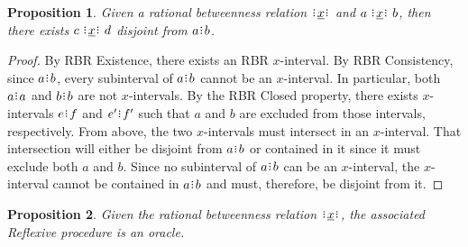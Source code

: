 \documentclass[12pt]{article}
\newtheorem{proposition}{Proposition}[section]
\begin{document}
\begin{proposition}
    Given  a rational betweenness relation $\xrel$ and \sout{$a\xrel b$}, then there exists $c \xrel d$ disjoint from $a\rint b$.
\end{proposition}

\begin{proof}
    By RBR Existence, there exists an RBR $x$-interval. By RBR Consistency,  since \sout{$a\rint b$}, every subinterval of $a \rint b$ cannot be an $x$-interval. In particular, both $a\rint a$ and $b\rint b$ are not $x$-intervals. By the RBR Closed property, there exists $x$-intervals $e\rint f$ and $e'\rint f'$ such that $a$ and $b$ are excluded from those intervals, respectively. From above, the two $x$-intervals must intersect in an $x$-interval. That intersection will either be disjoint from $a\rint b$ or contained in it since it must exclude both $a$ and $b$. Since no subinterval of $a \rint b$ can be an $x$-interval, the $x$-interval cannot be contained in $a \rint b$ and must, therefore, be disjoint from it. 
\end{proof}

\begin{proposition}
    Given the rational betweenness relation $\xrel$, the associated Reflexive procedure is an oracle. 
\end{proposition}
\end{document}
